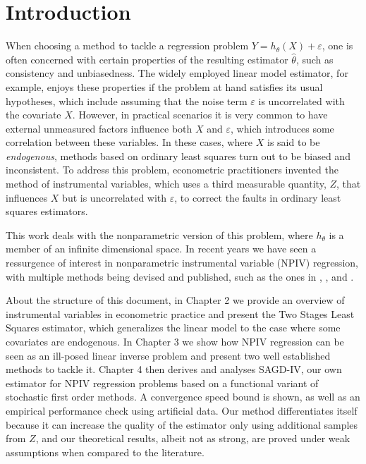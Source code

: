 \chapter{Introduction}

When choosing a method to tackle a regression problem $ Y = h_{ \theta } ( X ) + \varepsilon $, one is often concerned with certain properties of the resulting estimator $ \hat{ \theta } $, such as consistency and unbiasedness.
The widely employed linear model estimator, for example, enjoys these properties if the problem at hand satisfies its usual hypotheses, which include assuming that the noise term $ \varepsilon $ is uncorrelated with the covariate $ X $.
However, in practical scenarios it is very common to have external unmeasured factors influence both $ X $ and $ \varepsilon $, which introduces some correlation between these variables.
In these cases, where $ X $ is said to be \emph{endogenous}, methods based on ordinary least squares turn out to be biased and inconsistent.
To address this problem, econometric practitioners invented the method of instrumental variables, which uses a third measurable quantity, $ Z $, that influences $ X $ but is uncorrelated with $ \varepsilon $, to correct the faults in ordinary least squares estimators.

This work deals with the nonparametric version of this problem, where $ h_{ \theta } $ is a member of an infinite dimensional space.
In recent years we have seen a ressurgence of interest in nonparametric instrumental variable (NPIV) regression, with multiple methods being devised and published, such as the ones in \cite{singh2019}, \cite{deepiv2017}, \cite{deepgmm2019} and \cite{dualiv2020}.

About the structure of this document, in Chapter 2 we provide an overview of instrumental variables in econometric practice and present the Two Stages Least Squares estimator, which generalizes the linear model to the case where some covariates are endogenous.
In Chapter 3 we show how NPIV regression can be seen as an ill-posed linear inverse problem and present two well established methods to tackle it.
Chapter 4 then derives and analyses SAGD-IV, our own estimator for NPIV regression problems based on a functional variant of stochastic first order methods.
A convergence speed bound is shown, as well as an empirical performance check using artificial data.
Our method differentiates itself because it can increase the quality of the estimator only using additional samples from $ Z $, and our theoretical results, albeit not as strong, are proved under weak assumptions when compared to the literature.
